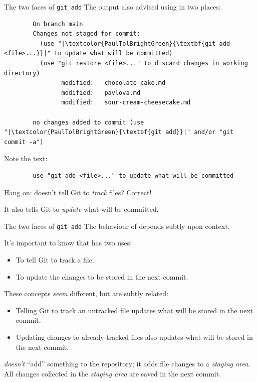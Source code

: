\documentclass{git_course}
\begin{document}
\begin{frame}[fragile]{The two faces of \texttt{git add}}
    The  output also advised using  in two
    places:
    \begin{verbatim}
        On branch main
        Changes not staged for commit:
          (use "|\textcolor{PaulTolBrightGreen}{\textbf{git add <file>...}}|" to update what will be committed)
          (use "git restore <file>..." to discard changes in working directory)
                modified:   chocolate-cake.md
                modified:   pavlova.md
                modified:   sour-cream-cheesecake.md

        no changes added to commit (use "|\textcolor{PaulTolBrightGreen}{\textbf{git add}}|" and/or "git commit -a")
    \end{verbatim}

    Note the text:
    \begin{verbatim}
        use "git add <file>..." to update what will be committed
    \end{verbatim}

    Hang on: doesn't  tell Git to \emph{track} files?  Correct!

    It also tells Git to \emph{update} what will be committed.
\end{frame}

\begin{frame}[fragile]{The two faces of \texttt{git add}}
    The behaviour of  depends subtly upon context.

    It's important to know that  has two uses:
    \begin{itemize}
        \item To tell Git to track a file.
        \item To update the changes to be stored in the next commit.
    \end{itemize}

    These concepts \emph{seem} different, but are subtly related:
    \begin{itemize}
        \item Telling Git to track an untracked file updates what will be
            stored in the next commit.
        \item Updating changes to already-tracked files also updates what
            will be stored in the next commit.
    \end{itemize}

     \emph{doesn't} ``add'' something to the repository; it
    adds file changes to a \emph{staging area}.  All changes collected in
    the \emph{staging area} are saved in the next commit.
\end{frame}
\end{document}

